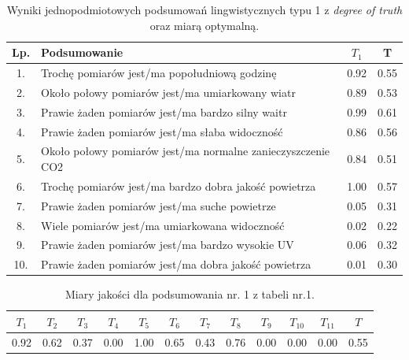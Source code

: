 \documentclass{article}
\begin{document}
\begin{table}[H]
    \centering
    \normalsize
    \begin{tabular}{|c|p{8cm}|c|c|}
    \hline
    \textbf{Lp.} &\textbf{Podsumowanie} & \textbf{\(T_1\)} & \textbf{T} \\ \hline
    1. & Trochę pomiarów  jest/ma popołudniową godzinę & 0.92 & 0.55 \\ \hline
    2. & Około połowy pomiarów jest/ma umiarkowany wiatr & 0.89 & 0.53 \\ \hline
    3. & Prawie żaden pomiarów jest/ma bardzo silny waitr & 0.99 & 0.61 \\ \hline
    4. & Prawie żaden pomiarów jest/ma słaba widoczność & 0.86 & 0.56 \\ \hline
    5. & Około połowy pomiarów  jest/ma normalne zanieczyszczenie CO2 & 0.84 & 0.51 \\ \hline
    6. & Trochę pomiarów jest/ma bardzo dobra jakość powietrza & 1.00 & 0.57 \\ \hline
    7. & Prawie żaden pomiarów jest/ma suche powietrze & 0.05 & 0.31 \\ \hline
    8. & Wiele pomiarów  jest/ma umiarkowana widoczność & 0.02 & 0.22 \\ \hline
    9. & Prawie żaden pomiarów jest/ma bardzo wysokie UV & 0.06 & 0.32 \\ \hline
    10. & Prawie żaden pomiarów jest/ma dobra jakość powietrza & 0.01 & 0.30 \\ \hline 


    \end{tabular}
    \caption{Wyniki jednopodmiotowych podsumowań lingwistycznych typu 1 z \textit{degree of truth} oraz miarą optymalną.}
\end{table}

  \begin{table}[H]
    \centering
    \begin{tabular}{|c|c|c|c|c|c|c|c|c|c|c|c|}
    \hline
    \textbf{\(T_1\)} &\textbf{\(T_2\)} & \textbf{\(T_3\)} & \textbf{\(T_4\)} & \textbf{\(T_5\)} & \textbf{\(T_6\)} & \textbf{\(T_7\)} & \textbf{\(T_8\)} & \textbf{\(T_9\)} & \textbf{\(T_{10}\)} & \textbf{\(T_{11}\)} & \textbf{\(T\)} \\ \hline
    0.92 & 0.62 & 0.37 & 0.00 & 1.00 & 0.65 & 0.43 & 0.76 & 0.00 & 0.00 & 0.00 & 0.55 \\ \hline
    \end{tabular}
    \caption{Miary jakości dla podsumowania nr. 1 z tabeli nr.1.}
\end{table}  
\end{document}
